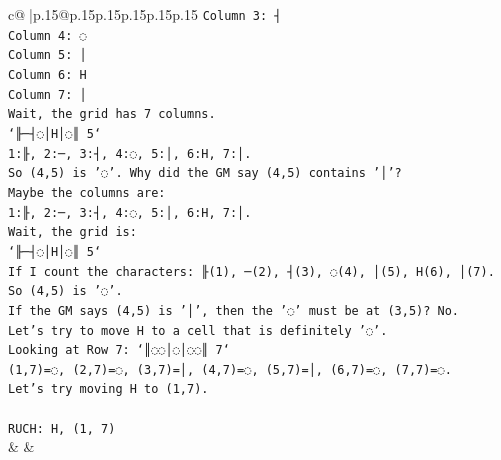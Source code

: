 \documentclass{article}
\begin{document}
{\begin{supertabular}{c@{$\;$}|p{.15\linewidth}@{}p{.15\linewidth}p{.15\linewidth}p{.15\linewidth}p{.15\linewidth}p{.15\linewidth}}
{{{\texttt{Column 3: ┤} \\
\texttt{Column 4: ◌} \\
\texttt{Column 5: │} \\
\texttt{Column 6: H} \\
\texttt{Column 7: │} \\
\texttt{Wait, the grid has 7 columns.} \\
\texttt{`╟─┤◌│H│◌║ 5`} \\
\texttt{1:╟, 2:─, 3:┤, 4:◌, 5:│, 6:H, 7:│.} \\
\texttt{So (4,5) is '◌'. Why did the GM say (4,5) contains '│'?} \\
\texttt{Maybe the columns are:} \\
\texttt{1:╟, 2:─, 3:┤, 4:◌, 5:│, 6:H, 7:│.} \\
\texttt{Wait, the grid is:} \\
\texttt{`╟─┤◌│H│◌║ 5`} \\
\texttt{If I count the characters: ╟(1), ─(2), ┤(3), ◌(4), │(5), H(6), │(7).} \\
\texttt{So (4,5) is '◌'.} \\
\texttt{If the GM says (4,5) is '│', then the '◌' must be at (3,5)? No.} \\
\texttt{Let's try to move H to a cell that is definitely '◌'.} \\
\texttt{Looking at Row 7: `║◌◌│◌│◌◌║ 7`} \\
\texttt{(1,7)=◌, (2,7)=◌, (3,7)=│, (4,7)=◌, (5,7)=│, (6,7)=◌, (7,7)=◌.} \\
\texttt{Let's try moving H to (1,7).} \\
\\ 
\texttt{RUCH: H, (1, 7)} \\
            }
        }
    }
    & & \\ \\


\end{supertabular}}
\end{document}
